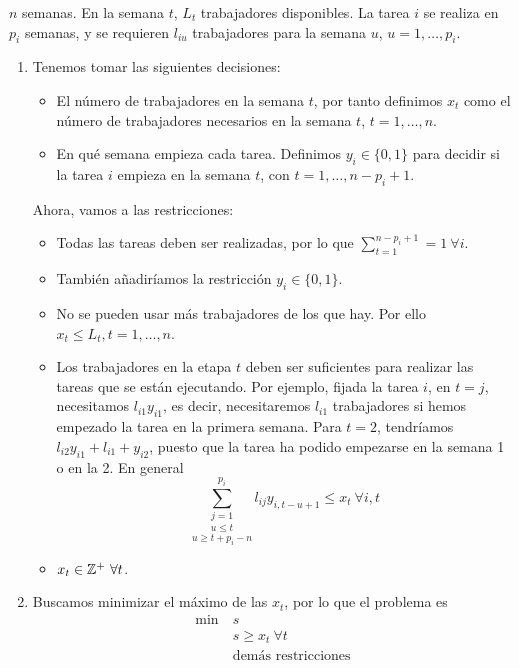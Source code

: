 \documentclass[twoside]{article}
\begin{document}
\begin{solucion}
$n$ semanas. En la semana $t$, $L_t$ trabajadores disponibles. La tarea $i$ se realiza en $p_i$ semanas, y se requieren $l_{iu}$ trabajadores para la semana $u$, $u=1,\dots,p_i$.
\begin{enumerate}
\item Tenemos tomar las siguientes decisiones:
\begin{itemize}
\item El número de trabajadores en la semana $t$, por tanto definimos $x_t$ como el número de trabajadores necesarios en la semana $t$, $t=1,\dots, n$. 
\item En qué semana empieza cada tarea. Definimos $y_i\in\{0,1\}$ para decidir si la tarea $i$ empieza en la semana $t$, con $t=1,\dots, n-p_i+1$. 
\end{itemize}
Ahora, vamos a las restricciones:
\begin{itemize}
\item Todas las tareas deben ser realizadas, por lo que $\sum_{t=1}^{n-p_i+1}=1\ \forall i$. 
\item También añadiríamos la restricción $y_i\in\{0,1\}$.
\item No se pueden usar más trabajadores de los que hay. Por ello $x_t\leq L_t, t=1,\dots, n$.
\item Los trabajadores en la etapa $t$ deben ser suficientes para realizar las tareas que se están ejecutando. Por ejemplo, fijada la tarea $i$, en $t=j$, necesitamos $l_{i1}y_{i1}$, es decir, necesitaremos $l_{i1}$ trabajadores si hemos empezado la tarea en la primera semana. Para $t=2$, tendríamos $l_{i2}y_{i1}+l_{i1}+y_{i2}$, puesto que la tarea ha podido empezarse en la semana 1 o en la 2. En general
$$ \underset{u\geq t+p_i-n}{\underset{u\leq t}{\sum_{j=1}^{p_i}}}l_{ij}y_{i,t-u+1}\leq x_t\ \forall i,t $$
\item $x_t\in\mathbb{Z}^+\ \forall t$.
\end{itemize}

\item Buscamos minimizar el máximo de las $x_t$, por lo que el problema es
\begin{align*}
\min\ & s\\
 & s\geq x_t\ \forall t\\
 &\text{demás restricciones}
\end{align*}
\end{enumerate}
\end{solucion}
\end{document}
